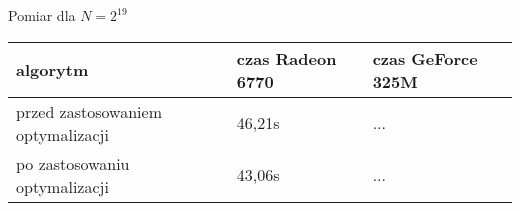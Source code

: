 
Pomiar dla $N = {2}^{19}$

\begin{tabular}{ |p{\dimexpr 0.3\linewidth}|
                  p{\dimexpr 0.3\linewidth}|
                  p{\dimexpr 0.3\linewidth}| }
 \hline algorytm & czas Radeon 6770 & czas GeForce 325M\\
 \hline
 przed zastosowaniem optymalizacji & 46,21s & ...\\
 \hline
 po zastosowaniu optymalizacji & 43,06s & ...\\
 \hline
\end{tabular}